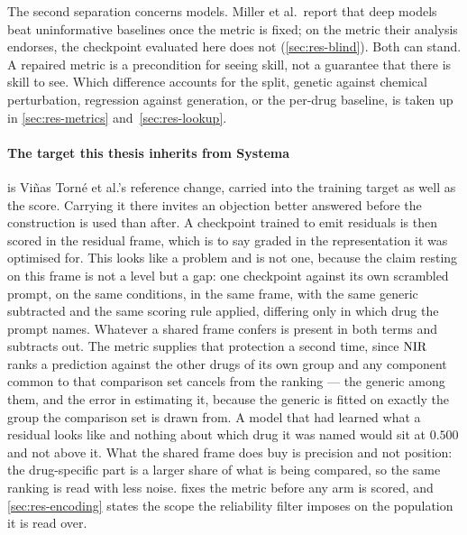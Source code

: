 The second separation concerns models. Miller et al.\ report that deep models
beat uninformative baselines once the metric is fixed; on the metric their
analysis endorses, the checkpoint evaluated here does not
(\cref{sec:res-blind}). Both can stand. A repaired metric is a precondition for
seeing skill, not a guarantee that there is skill to see. Which difference
accounts for the split, genetic against chemical perturbation, regression against
generation, or the per-drug baseline, is taken up in \cref{sec:res-metrics}
and~\cref{sec:res-lookup}.

\paragraph{The target this thesis inherits from Systema} 

 is Vi\~nas Torn\'e et al.'s reference change, carried
into the training target as well as the score. Carrying it there invites an objection better answered before the construction is
used than after. A checkpoint trained to emit residuals is then scored in the
residual frame, which is to say graded in the representation it was optimised
for. This looks like a problem and is not one, because the claim resting on this frame is not a
level but a gap: one checkpoint against its own scrambled prompt, on the same
conditions, in the same frame, with the same generic subtracted and the same
scoring rule applied, differing only in which drug the prompt names. Whatever a
shared frame confers is present in both terms and subtracts out. The metric
supplies that protection a second time, since $\textrm{NIR}$ ranks a prediction against
the other drugs of its own group and any component common to that comparison set
cancels from the ranking --- the generic among them, and the error in estimating
it, because the generic is fitted on exactly the group the comparison set is
drawn from. A model that had learned what a residual looks like and nothing about
which drug it was named would sit at $0.500$ and not above it. What the shared
frame does buy is precision and not position: the drug-specific part is a larger
share of what is being compared, so the same ranking is read with less noise.
 fixes the metric before any arm is scored, and
\cref{sec:res-encoding} states the scope the reliability filter imposes on the
population it is read over.


